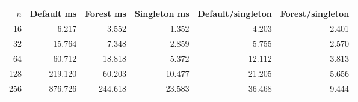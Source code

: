 \begingroup
\small\setlength{\tabcolsep}{4pt}
\begin{tabular}{rrrrrr}
\toprule
$n$ & Default ms & Forest ms & Singleton ms & Default/singleton & Forest/singleton \\
\midrule
16 & 6.217 & 3.552 & 1.352 & 4.203 & 2.401 \\
32 & 15.764 & 7.348 & 2.859 & 5.755 & 2.570 \\
64 & 60.712 & 18.818 & 5.372 & 12.112 & 3.813 \\
128 & 219.120 & 60.203 & 10.477 & 21.205 & 5.656 \\
256 & 876.726 & 244.618 & 23.583 & 36.468 & 9.444 \\
\bottomrule
\end{tabular}
\endgroup
